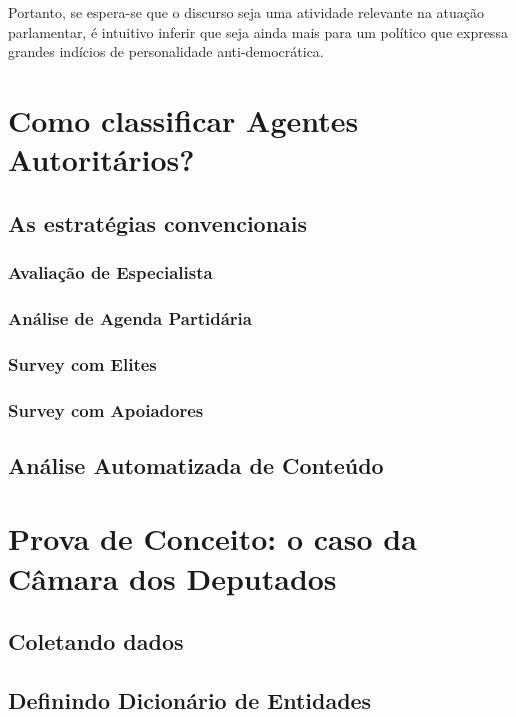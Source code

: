 \documentclass[
12pt,				%
openright,			%
twoside,			%
a4paper,			%
english,			%
french,				%
spanish,			%
brazil				%
]{abntex2}
\begin{document}
Portanto, se espera-se que o discurso seja uma atividade relevante na atuação parlamentar, é intuitivo inferir que seja ainda mais para um político que expressa grandes indícios de personalidade anti-democrática. 

\chapter{Como classificar Agentes Autoritários?}\label{metodologia}

\section{As estratégias convencionais}

\subsection{Avaliação de Especialista}

\subsection{Análise de Agenda Partidária}

\subsection{Survey com Elites}

\subsection{Survey com Apoiadores}

\section{Análise Automatizada de Conteúdo}

\chapter{Prova de Conceito: o caso da Câmara dos Deputados}\label{resultados}

\section{Coletando dados}

\section{Definindo Dicionário de Entidades}
\end{document}
